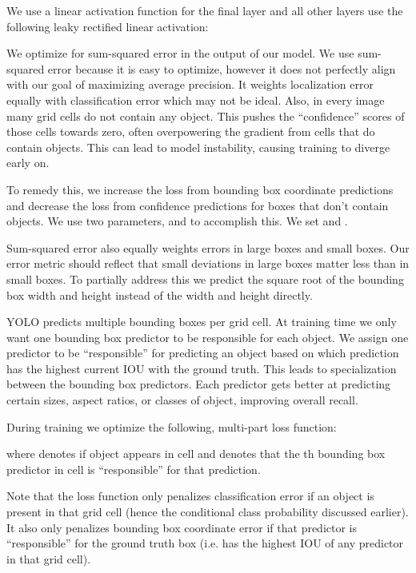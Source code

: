\documentclass[10pt,twocolumn,letterpaper]{article}
\begin{document}
We use a linear activation function for the final layer and all other layers use the following leaky rectified linear activation:



We optimize for sum-squared error in the output of our model. We use sum-squared error because it is easy to optimize, however it does not perfectly align with our goal of maximizing average precision. It weights localization error equally with classification error which may not be ideal. Also, in every image many grid cells do not contain any object. This pushes the ``confidence'' scores of those cells towards zero, often overpowering the gradient from cells that do contain objects. This can lead to model instability, causing training to diverge early on.

To remedy this, we increase the loss from bounding box coordinate predictions and decrease the loss from confidence predictions for boxes that don't contain objects. We use two parameters,  and  to accomplish this. We set  and .

Sum-squared error also equally weights errors in large boxes and small boxes. Our error metric should reflect that small deviations in large boxes matter less than in small boxes. To partially address this we predict the square root of the bounding box width and height instead of the width and height directly. 


YOLO predicts multiple bounding boxes per grid cell. At training time we only want one bounding box predictor to be responsible for each object. We assign one predictor to be ``responsible'' for predicting an object based on which prediction has the highest current IOU with the ground truth. This leads to specialization between the bounding box predictors. Each predictor gets better at predicting certain sizes, aspect ratios, or classes of object, improving overall recall.

During training we optimize the following, multi-part loss function:
\scriptsize

\normalsize
where  denotes if object appears in cell  and  denotes that the th bounding box predictor in cell  is ``responsible'' for that prediction.

Note that the loss function only penalizes classification error if an object is present in that grid cell (hence the conditional class probability discussed earlier). It also only penalizes bounding box coordinate error if that predictor is ``responsible'' for the ground truth box (i.e. has the highest IOU of any predictor in that grid cell).
\end{document}
